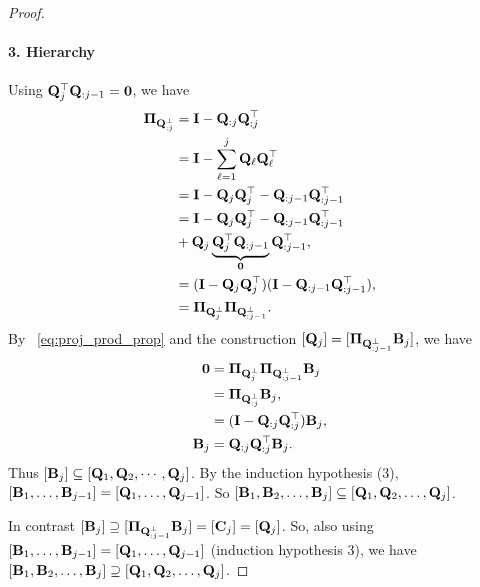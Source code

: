 \begin{proof}
    \paragraph{3. Hierarchy} Using $\mathbf{Q}_j^\top\mathbf{Q}_{:j-1} = \bm{0}$, we have
    \begin{align}\label{eq:proj_prod_prop}
        \begin{aligned}
            \boldsymbol{\Pi}_{\mathbf{Q}_{:j}^\perp} &= \mathbf{I} -\mathbf{Q}_{:j}\mathbf{Q}_{:j}^\top \\
               &= \mathbf{I} -\sum_{\ell = 1}^j\mathbf{Q}_{\ell}\mathbf{Q}_{\ell}^\top\\
               &= \mathbf{I} - \mathbf{Q}_j \mathbf{Q}_j^\top - \mathbf{Q}_{:j-1}\mathbf{Q}_{:j-1}^\top \\
               &= \mathbf{I} - \mathbf{Q}_j \mathbf{Q}_j^\top - \mathbf{Q}_{:j-1}\mathbf{Q}_{:j-1}^\top \\
               &+ \mathbf{Q}_j \underbrace{\mathbf{Q}_j^\top \mathbf{Q}_{:j-1}}_{\bm{0}}\mathbf{Q}_{:j-1}^\top,\\
               &= (\mathbf{I} - \mathbf{Q}_j \mathbf{Q}_j^\top)(\mathbf{I} - \mathbf{Q}_{:j-1}\mathbf{Q}_{:j-1}^\top),\\
               &= \boldsymbol{\Pi}_{\mathbf{Q}^\perp_j} \boldsymbol{\Pi}_{\mathbf{Q}_{:j-1}^\perp}.\\
        \end{aligned}
    \end{align}
    By ~\cref{eq:proj_prod_prop} and the construction $[\mathbf{Q}_j] = [\boldsymbol{\Pi}_{\mathbf{Q}_{:j-1}^\perp}\mathbf{B}_j]$, we have
    \begin{align*}
        \bm{0} &= \boldsymbol{\Pi}_{\mathbf{Q}_j^\perp}\boldsymbol{\Pi}_{\mathbf{Q}_{:j-1}^\perp}\mathbf{B}_j\\
               &= \boldsymbol{\Pi}_{\mathbf{Q}_{:j}^\perp}\mathbf{B}_j,\\
               &= (\mathbf{I} - \mathbf{Q}_{:j}\mathbf{Q}_{:j}^\top)\mathbf{B}_j,\\
        \mathbf{B}_j   &= \mathbf{Q}_{:j}\mathbf{Q}_{:j}^\top \mathbf{B}_j.
    \end{align*}
    Thus $[\mathbf{B}_j] \subseteq [\mathbf{Q}_1,\mathbf{Q}_2,\cdots ,\mathbf{Q}_j]$. By the induction hypothesis (3), $[\mathbf{B}_1,\dots,\mathbf{B}_{j-1}] = [\mathbf{Q}_1,\dots,\mathbf{Q}_{j-1}]$. So $[\mathbf{B}_1,\mathbf{B}_2,\dots,\mathbf{B}_j] \subseteq [\mathbf{Q}_1,\mathbf{Q}_2, \dots, \mathbf{Q}_j]$.
    
    In contrast $[\mathbf{B}_j] \supseteq [\boldsymbol{\Pi}_{\mathbf{Q}_{:j-1}^\perp}\mathbf{B}_j] = [\mathbf{C}_j] = [\mathbf{Q}_j]$. So, also using $[\mathbf{B}_1,\dots,\mathbf{B}_{j-1}] = [\mathbf{Q}_1,\dots,\mathbf{Q}_{j-1}]$ (induction hypothesis 3),  we have $[\mathbf{B}_1,\mathbf{B}_2,\dots,\mathbf{B}_j] \supseteq [\mathbf{Q}_1,\mathbf{Q}_2,\dots,\mathbf{Q}_j]$. %


\end{proof}
